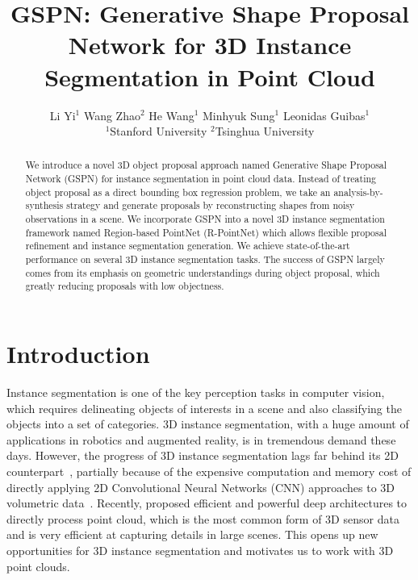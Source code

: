 \documentclass[10pt,twocolumn,letterpaper]{article}
\begin{document}
\title{GSPN: Generative Shape Proposal Network for 3D Instance Segmentation in Point Cloud}


\author{Li Yi$^1$ \qquad Wang Zhao$^2$ \qquad He Wang$^1$ \qquad Minhyuk Sung$^1$  \qquad Leonidas Guibas$^1$\\$^1$Stanford University \qquad $^2$Tsinghua University}



\maketitle
\setlength\abovedisplayskip{5pt}
\setlength\belowdisplayskip{5pt}

\begin{abstract}
We introduce a novel 3D object proposal approach named Generative Shape Proposal Network (GSPN) for instance segmentation in point cloud data. Instead of treating object proposal as a direct bounding box regression problem, we take an analysis-by-synthesis strategy and generate proposals by reconstructing shapes from noisy observations in a scene. We incorporate GSPN into a novel 3D instance segmentation framework named Region-based PointNet (R-PointNet) which allows flexible proposal refinement and instance segmentation generation. We achieve state-of-the-art performance on several 3D instance segmentation tasks. The success of GSPN largely comes from its emphasis on geometric understandings during object proposal, which greatly reducing proposals with low objectness.
\end{abstract}
\vspace{-\baselineskip}

\section{Introduction}
\noindent Instance segmentation is one of the key perception tasks in computer vision, which requires delineating objects of interests in a scene and also classifying the objects into a set of categories. 3D instance segmentation, with a huge amount of applications in robotics and augmented reality, is in tremendous demand these days. However, the progress of 3D instance segmentation lags far behind its 2D counterpart~\cite{he2017mask, liu2018path, li2016fully}, partially because of the expensive computation and memory cost of directly applying 2D Convolutional Neural Networks (CNN) approaches to 3D volumetric data~\cite{song2016deep, deng2017amodal}. Recently, \cite{qi2017pointnet, qi2017pointnet++} proposed efficient and powerful deep architectures to directly process point cloud, which is the most common form of 3D sensor data and is very efficient at capturing details in large scenes. This opens up new opportunities for 3D instance segmentation and motivates us to work with 3D point clouds.
\end{document}
